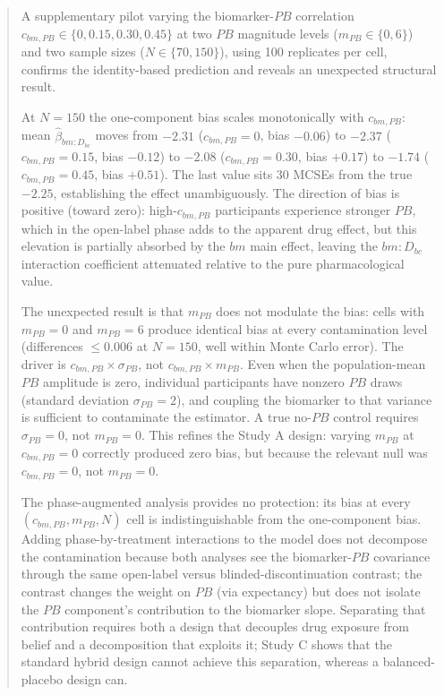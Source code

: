 \documentclass[
  11pt,
]{article}
\newenvironment{orig}{%
  \begin{quote}\normalsize\color[gray]{0.55}}{%
  \end{quote}}
\begin{document}
\begin{orig}
A supplementary pilot varying the biomarker-\(PB\) correlation
\(c_{bm,PB} \in \{0, 0.15, 0.30, 0.45\}\) at two \(PB\) magnitude
levels (\(m_{PB} \in \{0, 6\}\)) and two sample sizes
(\(N \in \{70, 150\}\)), using 100 replicates per cell, confirms
the identity-based prediction and reveals an unexpected structural
result.

At \(N=150\) the one-component bias scales monotonically with
\(c_{bm,PB}\): mean \(\hat\beta_{bm:D_{bc}}\) moves from \(-2.31\)
(\(c_{bm,PB}=0\), bias \(-0.06\)) to \(-2.37\) (\(c_{bm,PB}=0.15\),
bias \(-0.12\)) to \(-2.08\) (\(c_{bm,PB}=0.30\), bias \(+0.17\)) to
\(-1.74\) (\(c_{bm,PB}=0.45\), bias \(+0.51\)). The last value sits
30 MCSEs from the true \(-2.25\), establishing
the effect unambiguously. The direction of bias is positive
(toward zero): high-\(c_{bm,PB}\) participants experience stronger
\(PB\), which in the open-label phase adds to the apparent drug
effect, but this elevation is partially absorbed by the \(bm\) main
effect, leaving the \(bm:D_{bc}\) interaction coefficient attenuated
relative to the pure pharmacological value.

The unexpected result is that \(m_{PB}\) does not modulate the
bias: cells with \(m_{PB}=0\) and \(m_{PB}=6\) produce identical
bias at every contamination level (differences \(\leq 0.006\) at
\(N=150\), well within Monte Carlo error). The driver is
\(c_{bm,PB} \times \sigma_{PB}\), not \(c_{bm,PB} \times m_{PB}\).
Even when the population-mean \(PB\) amplitude is zero, individual
participants have nonzero \(PB\) draws (standard deviation
\(\sigma_{PB}=2\)), and coupling the biomarker to that variance is
sufficient to contaminate the estimator. A true no-\(PB\) control
requires \(\sigma_{PB}=0\), not \(m_{PB}=0\). This refines the
Study A design: varying \(m_{PB}\) at \(c_{bm,PB}=0\) correctly
produced zero bias, but because the relevant null was
\(c_{bm,PB}=0\), not \(m_{PB}=0\).

The phase-augmented analysis provides no protection: its bias
at every \((c_{bm,PB}, m_{PB}, N)\) cell is indistinguishable
from the one-component bias. Adding phase-by-treatment
interactions to the model does not decompose the contamination
because both analyses see the biomarker-\(PB\) covariance through
the same open-label versus blinded-discontinuation contrast;
the contrast changes the weight on \(PB\) (via expectancy) but
does not isolate the \(PB\) component's contribution to the
biomarker slope. Separating that contribution requires both a
design that decouples drug exposure from belief and a
decomposition that exploits it; Study C shows that the standard
hybrid design cannot achieve this separation, whereas a
balanced-placebo design can.


\end{orig}
\end{document}
